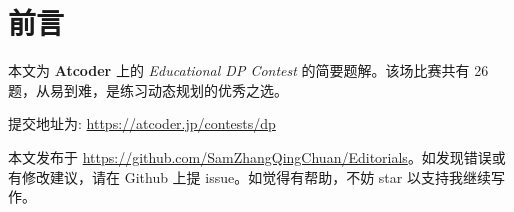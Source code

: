 \maketitle
\tableofcontents
\newpage
\section*{前言}

本文为 \textbf{Atcoder} 上的 \emph{Educational DP Contest} 的简要题解。该场比赛共有 26 题，从易到难，是练习动态规划的优秀之选。

提交地址为: \url{https://atcoder.jp/contests/dp}

本文发布于 \url{https://github.com/SamZhangQingChuan/Editorials}。如发现错误或有修改建议，请在 Github 上提 issue。如觉得有帮助，不妨 star 以支持我继续写作。

\newpage

